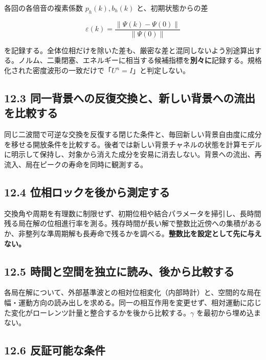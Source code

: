 \documentclass[
  a4paper,
]{ltjsarticle}
\begin{document}
各回の各倍音の複素係数 \(p_h(k),b_h(k)\) と、初期状態からの差

\[
\varepsilon(k)=
\frac{\|\Psi(k)-\Psi(0)\|}{\|\Psi(0)\|}
\]

を記録する。全体位相だけを除いた差も、厳密な差と混同しないよう別途算出する。ノルム、二乗閉塞、エネルギーに相当する候補指標を\textbf{別々に}記録する。規格化された密度波形の一致だけで「\(U^n=I\)」と判定しない。

\subsection{12.3
同一背景への反復交換と、新しい背景への流出を比較する}\label{ux540cux4e00ux80ccux666fux3078ux306eux53cdux5fa9ux4ea4ux63dbux3068ux65b0ux3057ux3044ux80ccux666fux3078ux306eux6d41ux51faux3092ux6bd4ux8f03ux3059ux308b}

同じ二波間で可逆な交換を反復する閉じた条件と、毎回新しい背景自由度に成分を移せる開放条件を比較する。後者では新しい背景チャネルの状態を計算モデルに明示して保持し、対象から消えた成分を安易に消去しない。背景への流出、再流入、局在ピークの寿命を同時に観測する。

\subsection{12.4
位相ロックを後から測定する}\label{ux4f4dux76f8ux30edux30c3ux30afux3092ux5f8cux304bux3089ux6e2cux5b9aux3059ux308b}

交換角や周期を有理数に制限せず、初期位相や結合パラメータを掃引し、長時間残る局在解の位相進行率を測る。残存時間が長い解で整数比近傍への集積があるか、非整列な準周期解も長寿命で残るかを調べる。\textbf{整数比を設定として先に与えない。}

\subsection{12.5
時間と空間を独立に読み、後から比較する}\label{ux6642ux9593ux3068ux7a7aux9593ux3092ux72ecux7acbux306bux8aadux307fux5f8cux304bux3089ux6bd4ux8f03ux3059ux308b}

各局在解について、外部基準波との相対位相変化（内部時計）と、空間的な局在幅・運動方向の読み出しを求める。同一の相互作用を変更せず、相対運動に応じた変化がローレンツ計量と整合するかを後から比較する。\(\gamma\)
を最初から埋め込まない。

\subsection{12.6
反証可能な条件}\label{ux53cdux8a3cux53efux80fdux306aux6761ux4ef6}
\end{document}
